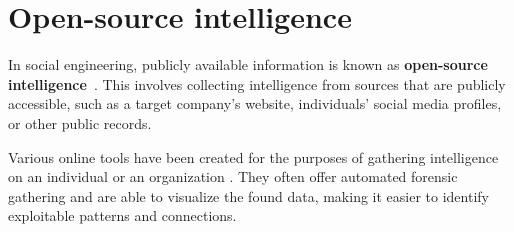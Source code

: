 \section{Open-source intelligence}
\begin{comment}

    - OSINT, sometimes written as OS-INT?
    - Data from publicly available resources
        - Company website
        - Social networking sites
        - Sites like archive.org and Google archives
        - Observing people in real life
    - Does not include calling the company and asking for information or any other forms of engagement
    - How modern AI augments OSINT gathering is analyzed in the last chapter
        - Exploration of how AI tools and techniques used for the automation and enhancement of OSINT processes
    - Stress the importance of OSINT within SE
    - Ethical considerations when it comes to OSINT
    - Some case studies highlighting the use of OSINT in real-world social engineering incidents?
    - Countermeasures will also be covered later
        - Strategies for companies to mitigate the risks associated with OSINT-based attacks
        - Integration of AI algorithms for analyzing and extracting valuable insights from OSINT data
        - Impact of AI-powered intelligence gathering of SE attacks
        
\end{comment}

In social engineering, publicly available information is known as \textbf{open-source intelligence}~\citep{hadnagy_Social_Engineering_The_Science_2018}. This involves collecting intelligence from sources that are publicly accessible, such as a target company's website, individuals' social media profiles, or other public records.

Various online tools have been created for the purposes of gathering intelligence on an individual or an organization \citep{mirsky_Threat_Offensive_AI_Organizations_2023}. They often offer automated forensic gathering and are able to visualize the found data, making it easier to identify exploitable patterns and connections.























